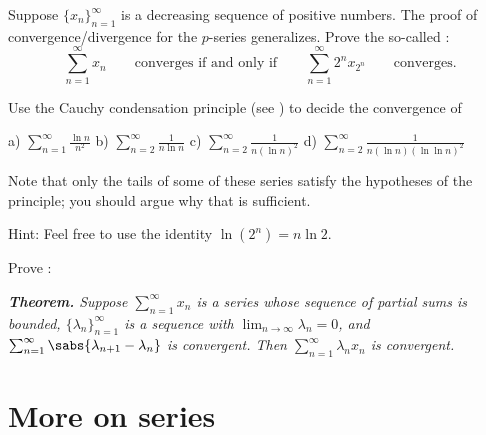 \begin{exercise}[Challenging] \label{exercise:cauchycondensation}
Suppose $\{ x_n\}_{n=1}^\infty$ is a decreasing sequence of positive numbers.
The proof of convergence/divergence for the $p$-series generalizes.
Prove the so-called 
\emph{}:
\begin{equation*}
\sum_{n=1}^\infty x_n
\qquad \text{converges if and only if} \qquad
\sum_{n=1}^\infty 2^n x_{2^n} \qquad \text{converges}.
\end{equation*}
\end{exercise}

\begin{exercise}
Use the Cauchy condensation principle
(see )
to decide the convergence of

\medskip

\noindent
a) $\displaystyle \sum_{n=1}^\infty \frac{\ln n}{n^2}$
\qquad
b) $\displaystyle \sum_{n=2}^\infty \frac{1}{n \ln n}$
\qquad
c) $\displaystyle \sum_{n=2}^\infty \frac{1}{n {(\ln n)}^2}$
\qquad
d) $\displaystyle \sum_{n=2}^\infty \frac{1}{n (\ln n ){(\ln \ln n)}^2}$

\medskip

\noindent
Note that only the tails of some of these series satisfy the
hypotheses of the principle; you should argue why that is sufficient.

\noindent
Hint: Feel free to use the identity $\ln (2^n) = n \ln 2$.
\end{exercise}

\begin{exercise}[Challenging]
Prove \emph{}:

\medskip

\noindent
\emph{\textbf{Theorem.} Suppose $\sum_{n=1}^\infty x_n$ is a series whose sequence of partial sums
is bounded, $\{ \lambda_n \}_{n=1}^\infty$ is a sequence with
$\lim_{n\to\infty} \lambda_n = 0$, and
$\sum_{n=1}^\infty \sabs{ \lambda_{n+1} - \lambda_n }$ is convergent.
Then $\sum_{n=1}^\infty \lambda_n x_n$ is convergent.}
\end{exercise}




\sectionnewpage
\section{More on series}
\label{sec:moreonseries}

